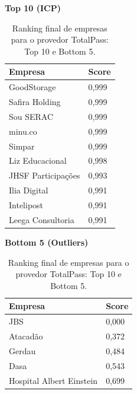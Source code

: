 \begin{table}[p]
    \centering
    \caption{Ranking final de empresas para o provedor TotalPass: Top 10 e Bottom 5.}
    \label{tab:7_6_ranking_totalpass}
    \begin{minipage}{0.48\textwidth}
    \centering
    \textbf{Top 10 (ICP)}\\
    \begin{tabular}{p{5cm}p{1.8cm}}
    \toprule
    Empresa & Score \\
    \midrule
    GoodStorage & 0,999 \\
    Safira Holding & 0,999 \\
    Sou SERAC & 0,999 \\
    minu.co & 0,999 \\
    Simpar & 0,999 \\
    Liz Educacional & 0,998 \\
    JHSF Participações & 0,993 \\
    Ilia Digital & 0,991 \\
    Intelipost & 0,991 \\
    Leega Consultoria & 0,991 \\
    \bottomrule
    \end{tabular}
    \end{minipage}\hfill
    \begin{minipage}{0.48\textwidth}
    \centering
    \textbf{Bottom 5 (Outliers)}\\
    \begin{tabular}{p{5cm}p{1.8cm}}
    \toprule
    Empresa & Score \\
    \midrule
    JBS & 0,000 \\
    Atacadão & 0,372 \\
    Gerdau & 0,484 \\
    Dasa & 0,543 \\
    Hospital Albert Einstein & 0,699 \\
    \bottomrule
    \end{tabular}
    \end{minipage}
\end{table}


